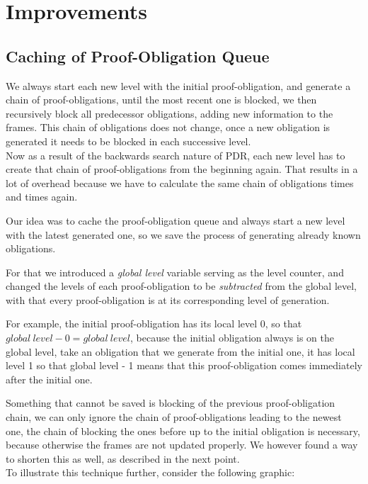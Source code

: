 \documentclass[11pt, a4paper, BCOR=10mm, ngerman, oneside]{scrbook}
\begin{document}
\section{Improvements}
\subsection{Caching of Proof-Obligation Queue}
We always start each new level with the initial proof-obligation, and generate a chain of proof-obligations, until the most recent one is blocked, we then recursively block all predecessor obligations, adding new information to the frames. This chain of obligations does not change, once a new obligation is generated it needs to be blocked in each successive level.\\
Now as a result of the backwards search nature of PDR, each new level has to create that chain of proof-obligations from the beginning again. That results in a lot of overhead because we have to calculate the same chain of obligations times and times again. \par
Our idea was to cache the proof-obligation queue and always start a new level with the latest generated one, so we save the process of generating already known obligations. \par For that we introduced a \textsl{global level} variable serving as the level counter, and changed the levels of each proof-obligation to be \textsl{subtracted} from the global level, with that every proof-obligation is at its corresponding level of generation. \par For example, the initial proof-obligation has its local level 0, so that $global\ level - 0 = global\ level$, because the initial obligation always is on the global level, take an obligation that we generate from the initial one, it has local level 1 so that global level - 1 means that this proof-obligation comes immediately after the initial one. \par
Something that cannot be saved is blocking of the previous proof-obligation chain, we can only ignore the chain of proof-obligations leading to the newest one, the chain of blocking the ones before up to the initial obligation is necessary, because otherwise the frames are not updated properly. We however found a way to shorten this as well, as described in the next point. \\ 
To illustrate this technique further, consider the following graphic: \\
\end{document}
